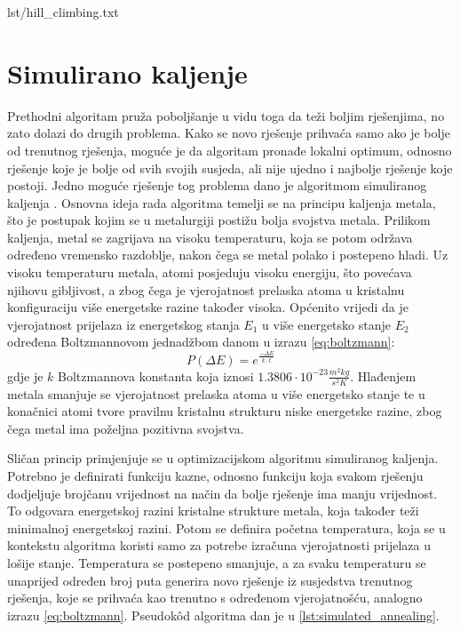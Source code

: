 \begin{minipage}{0.95\textwidth}
     {lst/hill_climbing.txt}
\end{minipage}


\section{Simulirano kaljenje}
Prethodni algoritam pruža poboljšanje u vidu toga da teži boljim rješenjima, no zato dolazi do drugih problema.
Kako se novo rješenje prihvaća samo ako je bolje od trenutnog rješenja, moguće je da algoritam pronađe lokalni optimum, odnosno rješenje koje je bolje od svih svojih susjeda, ali nije ujedno i najbolje rješenje koje postoji.
Jedno moguće rješenje tog problema dano je algoritmom simuliranog kaljenja \cite{SimulatedAnnealing}.
Osnovna ideja rada algoritma temelji se na principu kaljenja metala, što je postupak kojim se u metalurgiji postižu bolja svojstva metala.
Prilikom kaljenja, metal se zagrijava na visoku temperaturu, koja se potom održava određeno vremensko razdoblje, nakon čega se metal polako i postepeno hladi.
Uz visoku temperaturu metala, atomi posjeduju visoku energiju, što povećava njihovu gibljivost, a zbog čega je vjerojatnost prelaska atoma u kristalnu konfiguraciju više energetske razine također visoka.
Općenito vrijedi da je vjerojatnost prijelaza iz energetskog stanja $E_1$ u više energetsko stanje $E_2$ određena Boltzmannovom jednadžbom danom u izrazu \eqref{eq:boltzmann}\cite{PrirodomInspirirani}:
\begin{equation}\label{eq:boltzmann}
    P(\Delta E) = e^{\frac{-\Delta E}{k \cdot t}}
\end{equation}
gdje je $k$ Boltzmannova konstanta koja iznosi $1.3806 \cdot 10^{-23} \frac{m^2kg}{s^2 K}$.
Hlađenjem metala smanjuje se vjerojatnost prelaska atoma u više energetsko stanje te u konačnici atomi tvore pravilnu kristalnu strukturu niske energetske razine, zbog čega metal ima poželjna pozitivna svojstva.

Sličan princip primjenjuje se u optimizacijskom algoritmu simuliranog kaljenja.
Potrebno je definirati funkciju kazne, odnosno funkciju koja svakom rješenju dodjeljuje brojčanu vrijednost na način da bolje rješenje ima manju vrijednost.
To odgovara energetskoj razini kristalne strukture metala, koja također teži minimalnoj energetskoj razini.
Potom se definira početna temperatura, koja se u kontekstu algoritma koristi samo za potrebe izračuna vjerojatnosti prijelaza u lošije stanje.
Temperatura se postepeno smanjuje, a za svaku temperaturu se unaprijed određen broj puta generira novo rješenje iz susjedstva trenutnog rješenja, koje se prihvaća kao trenutno s određenom vjerojatnošću, analogno izrazu \eqref{eq:boltzmann}.
Pseudok\^{o}d algoritma dan je u \ref{lst:simulated_annealing}.

